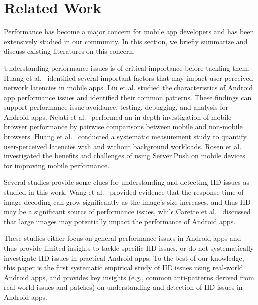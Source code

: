 \section{Related Work}\label{sec:related-work}
Performance has become a major concern for mobile app developers and has been extensively studied in our community.
In this section, we briefly summarize and discuss existing literatures on this concern.

Understanding performance issues is of critical importance before tackling them.
Huang et al.~\cite{huang2010anatomizing} identified several important factors that may impact user-perceived network latencies in mobile apps.
Liu et al.\cite{liu2014characterizing} studied the characteristics of Android app performance issues and identified their common patterns. These findings can support performance issue avoidance, testing, debugging, and analysis for Android apps. 
Nejati et al.~\cite{nejati2016depth} performed an in-depth investigation of mobile browser performance by pairwise comparisons between mobile and non-mobile browsers.
Huang et al.~\cite{huang2017shuffledog} conducted a systematic measurement study to quantify user-perceived latencies with and without background workloads.
Rosen et al.~\cite{rosen2017push} investigated the benefits and challenges of using Server Push on mobile devices for improving mobile performance.

Several studies provide some clues for understanding and detecting IID issues as studied in this work.
Wang et al.~\cite{wang2016profiling} provided evidence that the response time of image decoding can grow significantly as the image's size increases, and thus IID may be a significant source of performance issues,
while Carette et al.~\cite{carette2017investigating} discussed that large images may potentially impact the performance of Android apps. 

These studies either focus on general performance issues in Android apps and thus provide limited insights to tackle specific IID issues,
or do not systematically investigate IID issues in practical Android apps.
To the best of our knowledge, this paper is the first systematic empirical study of IID issues using real-world Android apps,
and provides key insights (e.g., common anti-patterns derived from real-world issues and patches) on understanding and detection of IID issues in Android apps.

